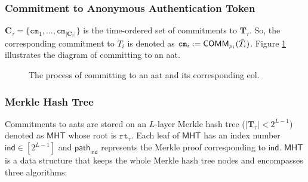 \subsubsection{Commitment to Anonymous Authentication Token}
$\mathbf{C}_\tau = \{\texttt{cm}_1, \dots, \texttt{cm}_{|\mathbf{C}_\tau|}\}$ is the time-ordered set of commitments to $\mathbf{T}_\tau$. So, the corresponding commitment to  $T_i$ is denoted as $\texttt{cm}_i := \mathsf{COMM}_{\rho_i}(\Tilde{T_i})$. Figure \ref{fig:zupply-token} illustrates the diagram of committing to an \gls{aat}.




\begin{figure}
	\centering
	
	\caption[Commitment to an Anonymous Authenticated Token]{The process of committing to an \gls{aat} and its corresponding \gls{eol}.}
	\label{fig:zupply-token}
\end{figure}


\subsubsection{Merkle Hash Tree}
Commitments to \gls{aat}s are stored on an $L$-layer Merkle hash tree ($|\mathbf{T}_\tau|<2^{L-1}$) denoted as $\mathsf{MHT}$ whose root is $\texttt{rt}_\tau$.
Each leaf of $\mathsf{MHT}$ has an index number $ \mathsf{ind}\in [2^{L-1}]$ and $\mathsf{path}_\mathsf{ind}$ represents the Merkle proof corresponding to $\mathsf{ind}$. %
$\mathsf{MHT}$ is a data structure that keeps the whole Merkle hash tree nodes and encompasses three algorithms: 

